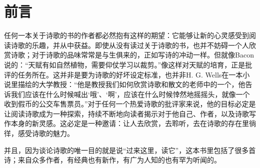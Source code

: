 \chapter*{前言}

任何一本关于诗歌的书的作者都必然抱有这样的期望：它能够让新的心灵感受到阅读诗歌的乐趣，并从中获益。即使从没有读过关于诗歌的书，也并不妨碍一个人欣赏诗歌；对于诗歌的品味常常是与生俱来的，正如写诗的冲动一样。但就像Bacon说的：“天赋有如自然植物，需要仰仗学习以裁剪。”像这样对天赋的培育，正是批评的任务所在。这并非是要为诗歌的好坏设定标准，也并非H. G. Wells在一本小说里描绘的大学教授：“他是教授我们如何欣赏诗歌和散文的老师中的一个，他告诉我们应该在什么时候喊出‘哦’、‘啊’，应该在什么时候悻然地摇摇头，就像一个收到假币的公交车售票员。”对于任何一个热爱诗歌的批评家来说，他的目标必定是让阅读诗歌成为一种探索，持续不断地向读者揭示对于他自己、作者，以及诗歌写作本身的新灵感。这必定是一种邀请：让人去欣赏，去聆听，去在诗歌的存在里徜徉，感受诗歌的魅力。

并且，因为谈论诗歌的唯一目的就是说“过来这里，读它”，这本书里包括了很多首诗；来自众多作者，有经典也有新作，有广为人知的也有罕为听闻的。
